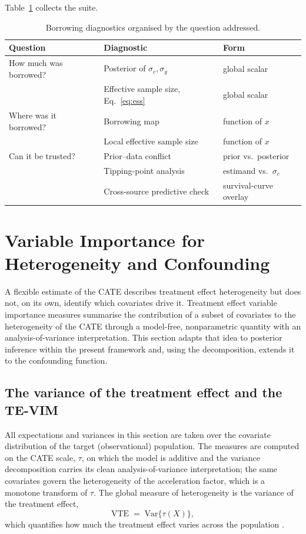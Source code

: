 \documentclass[11pt]{report}
\theoremstyle{plain}
\theoremstyle{definition}
\theoremstyle{remark}
\newcommand{\1}{\mathds{1}}
\theoremstyle{plain}
\theoremstyle{remark}
\newcommand{\Var}{\mathrm{Var}}
\newcommand{\vte}{\mathrm{VTE}}
\begin{document}
Table~\ref{tab:diag} collects the suite.

\begin{table}[tb]
\centering
\caption{Borrowing diagnostics organised by the question addressed.}
\label{tab:diag}
\begin{tabular}{@{}lll@{}}
\toprule
Question & Diagnostic & Form \\
\midrule
How much was borrowed?
  & Posterior of $\sigma_c, \sigma_g$ & global scalar \\
  & Effective sample size, Eq.~\eqref{eq:ess} & global scalar \\[2pt]
Where was it borrowed?
  & Borrowing map & function of $x$ \\
  & Local effective sample size & function of $x$ \\[2pt]
Can it be trusted?
  & Prior--data conflict & prior vs.\ posterior \\
  & Tipping-point analysis & estimand vs.\ $\sigma_c$ \\
  & Cross-source predictive check & survival-curve overlay \\
\bottomrule
\end{tabular}
\end{table}

\section{Variable Importance for Heterogeneity and Confounding}
\label{sec:pi-vim}

A flexible estimate of the CATE describes treatment effect heterogeneity but
does not, on its own, identify which covariates drive it. Treatment effect
variable importance measures \citep{hines2022} summarise the contribution of a
subset of covariates to the heterogeneity of the CATE through a model-free,
nonparametric quantity with an analysis-of-variance interpretation. This section
adapts that idea to posterior inference within the present framework and, using
the decomposition, extends it to the confounding function.

\subsection{The variance of the treatment effect and the TE-VIM}

All expectations and variances in this section are taken over the covariate
distribution of the target (observational) population. The measures are computed
on the CATE scale, $\tau$, on which the model is additive and the
variance decomposition carries its clean analysis-of-variance interpretation;
the same covariates govern the heterogeneity of the acceleration factor, which
is a monotone transform of $\tau$. The global measure of heterogeneity is the
variance of the treatment effect,
\begin{equation}
\label{eq:vte}
\vte \;=\; \Var\{\tau(X)\},
\end{equation}
which quantifies how much the treatment effect varies across the population
\citep{levy2021}.
\end{document}
